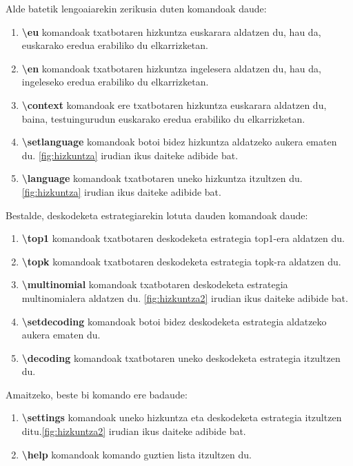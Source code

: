 \documentclass[11pt,a4paper]{article}
\begin{document}
Alde batetik lengoaiarekin zerikusia duten komandoak daude:
\begin{enumerate}
    \item \textbf{\textbackslash eu} komandoak txatbotaren hizkuntza euskarara aldatzen du, hau da, euskarako eredua erabiliko du elkarrizketan.
    \item \textbf{\textbackslash en} komandoak txatbotaren hizkuntza ingelesera aldatzen du, hau da, ingeleseko eredua erabiliko du elkarrizketan.
    \item \textbf{\textbackslash context} komandoak ere txatbotaren hizkuntza euskarara aldatzen du, baina, testuingurudun euskarako eredua erabiliko du elkarrizketan.
    \item \textbf{\textbackslash setlanguage} komandoak botoi bidez hizkuntza aldatzeko aukera ematen du. \ref{fig:hizkuntza} irudian ikus daiteke adibide bat.
    \item \textbf{\textbackslash language} komandoak txatbotaren uneko hizkuntza itzultzen du. \ref{fig:hizkuntza} irudian ikus daiteke adibide bat.
\end{enumerate}

Bestalde, deskodeketa estrategiarekin lotuta dauden komandoak daude:
\begin{enumerate}
   \item \textbf{\textbackslash top1} komandoak txatbotaren deskodeketa 
 estrategia top1-era aldatzen du.
    \item \textbf{\textbackslash topk} komandoak txatbotaren deskodeketa estrategia topk-ra aldatzen du.
    \item \textbf{\textbackslash multinomial} komandoak txatbotaren deskodeketa estrategia multinomialera aldatzen du.  \ref{fig:hizkuntza2} irudian ikus daiteke adibide bat.
    \item \textbf{\textbackslash setdecoding} komandoak botoi bidez deskodeketa estrategia aldatzeko aukera ematen du.
    \item \textbf{\textbackslash decoding} komandoak txatbotaren uneko deskodeketa estrategia itzultzen du.
\end{enumerate}

Amaitzeko, beste bi komando ere badaude:

\begin{enumerate}
    \item \textbf{\textbackslash settings} komandoak uneko hizkuntza eta deskodeketa estrategia itzultzen ditu.\ref{fig:hizkuntza2} irudian ikus daiteke adibide bat.
    \item \textbf{\textbackslash help} komandoak komando guztien lista itzultzen du.

\end{enumerate}
\end{document}
